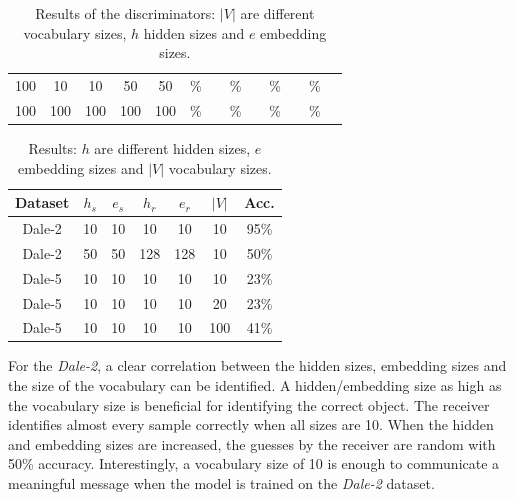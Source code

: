 \begin{table}[h]
\begin{tabular}{ccccc|cc|cc|cc|cc}
        {100} & {10}    & {10}    & {50}    & {50}    & {\%}                                & {}                                  & {\%}                                     & {}                                             & {\%}          & {}              & {\%}          & {}              \\
        {100} & {100}   & {100}   & {100}   & {100}   & {\%}                                & {}                                  & {\%}                                     & {}                                             & {\%}          & {}              & {\%}          & {}              \\
        \bottomrule
    \end{tabular}
    \caption{Results of the discriminators: $|V|$ are different vocabulary sizes, $h$ hidden sizes and $e$ embedding sizes.}
    \label{tab:results_discriminator}
\end{table}

\begin{table}[h]
    \centering
    \begin{tabular}{c|ccccc|c}
        \hline
        \textbf{Dataset} & $h_{s}$ & $e_{s}$ & $h_{r}$ & $e_{r}$ & $|V|$ & \textbf{Acc.} \\
        \hline
        Dale-2           & {10}    & {10}    & {10}    & {10}    & {10}  & {95\%}        \\
        Dale-2           & {50}    & {50}    & {128}   & {128}   & {10}  & {50\%}        \\
        Dale-5           & {10}    & {10}    & {10}    & {10}    & {10}  & {23\%}        \\
        Dale-5           & {10}    & {10}    & {10}    & {10}    & {20}  & {23\%}        \\
        Dale-5           & {10}    & {10}    & {10}    & {10}    & {100} & {41\%}        \\
        \hline
    \end{tabular}
    \caption{Results: $h$ are different hidden sizes, $e$ embedding sizes and $|V|$ vocabulary sizes.}
    \label{tab:results}
\end{table}

For the \emph{Dale-2}, a clear correlation between the hidden sizes, embedding sizes and the size of the vocabulary can be identified.
A hidden/embedding size as high as the vocabulary size is beneficial for identifying the correct object.
The receiver identifies almost every sample correctly when all sizes are 10.
When the hidden and embedding sizes are increased, the guesses by the receiver are random with 50\% accuracy.
Interestingly, a vocabulary size of 10 is enough to communicate a meaningful message when the model is trained on the \emph{Dale-2} dataset.

